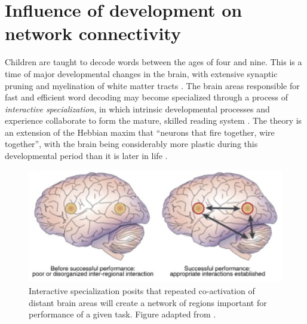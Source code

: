 \section{Influence of development on network connectivity}

Children are taught to decode words between the ages of four and nine. This is a time of major developmental changes in the brain, with extensive synaptic pruning and myelination of white matter tracts \citep{Wandell2013}. The brain areas responsible for fast and efficient word decoding may become specialized through a process of \textit{interactive specialization}, in which intrinsic developmental processes and experience collaborate to form the mature, skilled reading system \citep{Johnson2011, Klingberg2014}. The theory is an extension of the Hebbian maxim that ``neurons that fire together, wire together'', with the brain being considerably more plastic during this developmental period than it is later in life \citep{Hebb1949}.

\begin{figure}[t]
    \centering
    \includegraphics[width=5.5in]{images/ch1-interactive-specialization.jpg}
        \caption[Interactive specialization explains changes in activity]{Interactive specialization posits that repeated co-activation of distant brain areas will create a network of regions important for performance of a given task. Figure adapted from \cite{Gaffrey2013}.}
    \label{fig:ch1-interactive-specialization}
\end{figure}

